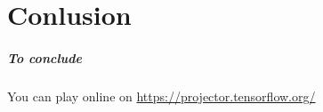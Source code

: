 \documentclass{beamer}\usepackage[]{graphicx}\usepackage[]{color}
\begin{document}
\part{Conlusion}
\begin{frame}
  \frametitle{To conclude}
  
  \begin{center}
      You can play online on \href{https://projector.tensorflow.org/}{https://projector.tensorflow.org/}
  \end{center}
  
\end{frame}

% 
%  
% 
% 
\end{document}
